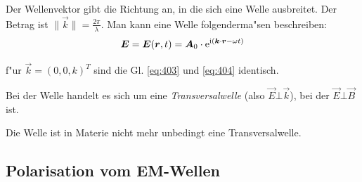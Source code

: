 \begin{Def}
    Der Wellenvektor gibt die Richtung an, in
   die sich eine Welle ausbreitet. Der Betrag ist $\|\vec k\| =
   \frac{2\pi}{\lambda}$. Man kann eine Welle folgenderma"sen
   beschreiben:
   \begin{equation}
      \label{eq:403}
      \boldsymbol{E} = \boldsymbol{E}(\boldsymbol{r}, t) = \boldsymbol{A}_0 \cdot \operatorname{e}^{\operatorname{i} (\boldsymbol{k}\cdot
        \boldsymbol{r} - \omega t)}
   \end{equation}
\end{Def}
f"ur $\vec k = (0,0,k)^T$ sind die Gl. \eqref{eq:403} und \eqref{eq:404}
identisch.

Bei der Welle handelt es sich um eine
\emph{Transversalwelle} (also $\vec E \bot
\vec k$), bei der $\vec E \bot
\vec B$ ist.
\begin{Wichtig}
   Die Welle ist in Materie nicht mehr unbedingt eine Transversalwelle.
\end{Wichtig}





\subsection{Polarisation vom EM-Wellen}
\label{kap_polarisation-vom-em-wellen}

